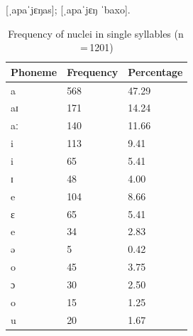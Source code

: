 \pex
	\a {} [ˌapaˈjɛŋas];
	\a {} [ˌapaˈjɛŋ ˈbaxo].
\xe

\begin{table}[pth]\centering
\caption[Frequency of nuclei in single syllables]{Frequency of nuclei in single 
syllables (n\,=\,1201)}
\begin{tabu} to 0.67\linewidth{X X[c] X[c]}
\tableheaderfont\toprule
Phoneme
	& Frequency
	& Percentage
	\\
	
\toprule

a
	& 568
	& 47.29\pct
	\\

aɪ
	& 171
	& 14.24\pct
	\\

aː
	& 140
	& 11.66\pct
	\\

\midrule

i
	& 113
	& 9.41\pct
	\\

\rowfont{\scriptsize\itshape}
\raggedleft
i
	& 65
	& 5.41\pct
	\\

\rowfont{\scriptsize\itshape}
\raggedleft
ɪ
	& 48
	& 4.00\pct
	\\

\midrule

e
	& 104
	& 8.66\pct
	\\

\rowfont{\scriptsize\itshape}
\raggedleft
ɛ
	& 65
	& 5.41\pct
	\\

\rowfont{\scriptsize\itshape}
\raggedleft
e
	& 34
	& 2.83\pct
	\\

\rowfont{\scriptsize\itshape}
\raggedleft
ə
	& 5
	& 0.42\pct
	\\

\midrule

o
	& 45
	& 3.75\pct
	\\

\rowfont{\scriptsize\itshape}
\raggedleft
ɔ
	& 30
	& 2.50\pct
	\\

\rowfont{\scriptsize\itshape}
\raggedleft
o
	& 15
	& 1.25\pct
	\\

\midrule

u
	& 20
	& 1.67\pct
	\\


\end{tabu}
\end{table}

